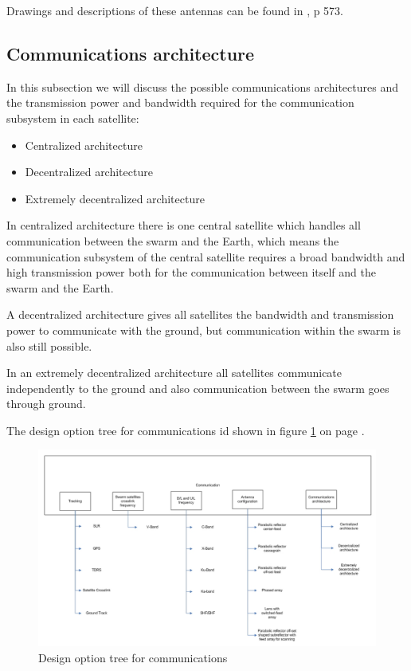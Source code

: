 Drawings and descriptions of these antennas can be found in \cite{larson}, p 573.

\subsection{Communications architecture}
In this subsection we will discuss the possible communications architectures and the transmission power and bandwidth required for the communication subsystem in each satellite:
\begin{itemize}
\item Centralized architecture
\item Decentralized architecture
\item Extremely decentralized architecture
\end{itemize}

In centralized architecture there is one central satellite which handles all communication between the swarm and the Earth, which means the communication subsystem of the central satellite requires a broad bandwidth and high transmission power both for the communication between itself and the swarm and the Earth.

A decentralized architecture gives all satellites the bandwidth and transmission power to communicate with the ground, but communication within the swarm is also still possible.

In an extremely decentralized architecture all satellites communicate independently to the ground and also communication between the swarm goes through ground.

The design option tree for communications id shown in figure \ref{fig:docom} on page \pageref{fig:docom}.

\begin{figure}
\centering
\includegraphics[width=1.0\textwidth, angle=90]{chapters/img/DOTCom.jpg}
\caption{Design option tree for communications}
\label{fig:docom}
\end{figure}